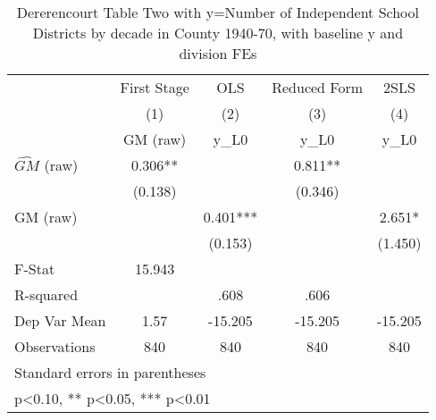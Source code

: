 \begin{table}[htbp]\centering
\def\sym#1{\ifmmode^{#1}\else\(^{#1}\)\fi}
\caption{Dererencourt Table Two with y=Number of Independent School Districts by decade in County 1940-70, with baseline y and division FEs}
\begin{tabular}{l*{4}{c}}
\toprule
                    & First Stage   &         OLS   &Reduced Form   &        2SLS   \\
                    &\multicolumn{1}{c}{(1)}&\multicolumn{1}{c}{(2)}&\multicolumn{1}{c}{(3)}&\multicolumn{1}{c}{(4)}\\
                    &\multicolumn{1}{c}{GM  (raw)}&\multicolumn{1}{c}{y\_L0}&\multicolumn{1}{c}{y\_L0}&\multicolumn{1}{c}{y\_L0}\\
\midrule
$\hat{GM}$ (raw)    &       0.306** &               &       0.811** &               \\
                    &     (0.138)   &               &     (0.346)   &               \\
\addlinespace
GM  (raw)           &               &       0.401***&               &       2.651*  \\
                    &               &     (0.153)   &               &     (1.450)   \\
\midrule
F-Stat              &      15.943   &               &               &               \\
R-squared           &               &        .608   &        .606   &               \\
Dep Var Mean        &        1.57   &     -15.205   &     -15.205   &     -15.205   \\
Observations        &         840   &         840   &         840   &         840   \\
\bottomrule
\multicolumn{5}{l}{\footnotesize Standard errors in parentheses}\\
\multicolumn{5}{l}{\footnotesize * p<0.10, ** p<0.05, *** p<0.01}\\
\end{tabular}
\end{table}
